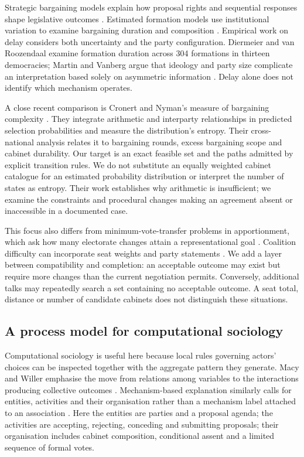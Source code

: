 \documentclass[11pt,a4paper]{article}
\begin{document}
Strategic bargaining models explain how proposal rights and sequential responses shape legislative outcomes \citep{baron1989}. Estimated formation models use institutional variation to examine bargaining duration and composition \citep{diermeier2003}. Empirical work on delay considers both uncertainty and the party configuration. Diermeier and van Roozendaal examine formation duration across 304 formations in thirteen democracies; Martin and Vanberg argue that ideology and party size complicate an interpretation based solely on asymmetric information \citep{diermeier1998,martin2003}. Delay alone does not identify which mechanism operates.

A close recent comparison is Cronert and Nyman's measure of bargaining complexity \citep{cronert2025}. They integrate arithmetic and interparty relationships in predicted selection probabilities and measure the distribution's entropy. Their cross-national analysis relates it to bargaining rounds, excess bargaining scope and cabinet durability. Our target is an exact feasible set and the paths admitted by explicit transition rules. We do not substitute an equally weighted cabinet catalogue for an estimated probability distribution or interpret the number of states as entropy. Their work establishes why arithmetic is insufficient; we examine the constraints and procedural changes making an agreement absent or inaccessible in a documented case.

This focus also differs from minimum-vote-transfer problems in apportionment, which ask how many electorate changes attain a representational goal \citep{bredereck2026}. Coalition difficulty can incorporate seat weights and party statements \citep{hiller2023}. We add a layer between compatibility and completion: an acceptable outcome may exist but require more changes than the current negotiation permits. Conversely, additional talks may repeatedly search a set containing no acceptable outcome. A seat total, distance or number of candidate cabinets does not distinguish these situations.

\subsection{A process model for computational sociology}

Computational sociology is useful here because local rules governing actors' choices can be inspected together with the aggregate pattern they generate. Macy and Willer emphasise the move from relations among variables to the interactions producing collective outcomes \citep{macy2002}. Mechanism-based explanation similarly calls for entities, activities and their organisation rather than a mechanism label attached to an association \citep{hedstrom2010}. Here the entities are parties and a proposal agenda; the activities are accepting, rejecting, conceding and submitting proposals; their organisation includes cabinet composition, conditional assent and a limited sequence of formal votes.
\end{document}
